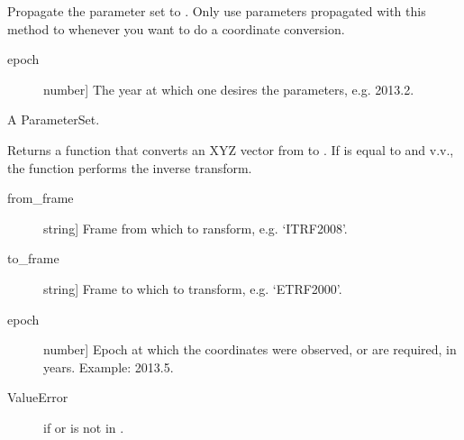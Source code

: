 \documentclass[a4paper,10pt,english]{sphinxmanual}
\begin{document}
\begin{fulllineitems}
\begin{fulllineitems}
\label{\detokenize{api-docs:etrsitrs.datumtransformation.DatumTransformation.propagate_parameters}}
Propagate the parameter set to  . Only use parameters
propagated with this method to  whenever you want to do
a coordinate conversion.

\begin{description}
\item[{epoch}] \leavevmode{[}number{]}
The year at which one desires the parameters,
e.g. 2013.2.

\end{description}


A ParameterSet.

\end{fulllineitems}


\begin{fulllineitems}
\label{\detokenize{api-docs:etrsitrs.datumtransformation.DatumTransformation.convert_fn}}
Returns a function  that converts an XYZ
vector from  to . If 
is equal to  and v.v., the function performs
the inverse transform.

\begin{description}
\item[{from\_frame}] \leavevmode{[}string{]}
Frame from which to ransform, e.g. ‘ITRF2008’.

\item[{to\_frame}] \leavevmode{[}string{]}
Frame to which to transform, e.g. ‘ETRF2000’.

\item[{epoch}] \leavevmode{[}number{]}
Epoch at which the coordinates were observed, or are
required, in years. Example: 2013.5.

\end{description}

\begin{description}
\item[{ValueError}] \leavevmode
if  or  is not in .


\end{description}
\end{fulllineitems}
\end{fulllineitems}
\end{document}

